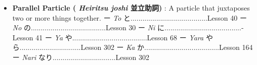 \begin{itemize}
\item \textbf{Parallel Particle ( \emph{Heiritsu joshi }並立助詞) }: A particle that juxtaposes two or more things together. \hfill\break
\hfill\break
ー \emph{To }と\dothyp{}\dothyp{}\dothyp{}\dothyp{}\dothyp{}\dothyp{}\dothyp{}\dothyp{}\dothyp{}\dothyp{}\dothyp{}\dothyp{}\dothyp{}\dothyp{}\dothyp{}\dothyp{}\dothyp{}\dothyp{}\dothyp{}\dothyp{}\dothyp{}\dothyp{}\dothyp{}\dothyp{}\dothyp{}\dothyp{}\dothyp{}\dothyp{}\dothyp{}\dothyp{}\dothyp{}\dothyp{}\dothyp{}\dothyp{}\dothyp{}\dothyp{}\dothyp{}\dothyp{}\dothyp{}Lesson 40 \hfill\break
ー \emph{No }の\dothyp{}\dothyp{}\dothyp{}\dothyp{}\dothyp{}\dothyp{}\dothyp{}\dothyp{}\dothyp{}\dothyp{}\dothyp{}\dothyp{}\dothyp{}\dothyp{}\dothyp{}\dothyp{}\dothyp{}\dothyp{}\dothyp{}\dothyp{}\dothyp{}\dothyp{}\dothyp{}\dothyp{}\dothyp{}\dothyp{}\dothyp{}\dothyp{}\dothyp{}\dothyp{}\dothyp{}\dothyp{}\dothyp{}\dothyp{}\dothyp{}\dothyp{}..Lesson 30 \hfill\break
ー \emph{Ni }に\dothyp{}\dothyp{}\dothyp{}\dothyp{}\dothyp{}\dothyp{}\dothyp{}\dothyp{}\dothyp{}\dothyp{}\dothyp{}\dothyp{}\dothyp{}\dothyp{}\dothyp{}\dothyp{}\dothyp{}\dothyp{}\dothyp{}\dothyp{}\dothyp{}\dothyp{}\dothyp{}\dothyp{}\dothyp{}\dothyp{}\dothyp{}\dothyp{}\dothyp{}\dothyp{}\dothyp{}\dothyp{}\dothyp{}\dothyp{}\dothyp{}\dothyp{}\dothyp{}\dothyp{}\dothyp{}Lesson 41 \hfill\break
ー \emph{Ya }や\dothyp{}\dothyp{}\dothyp{}\dothyp{}\dothyp{}\dothyp{}\dothyp{}\dothyp{}\dothyp{}\dothyp{}\dothyp{}\dothyp{}\dothyp{}\dothyp{}\dothyp{}\dothyp{}\dothyp{}\dothyp{}\dothyp{}\dothyp{}\dothyp{}\dothyp{}\dothyp{}\dothyp{}\dothyp{}\dothyp{}\dothyp{}\dothyp{}\dothyp{}\dothyp{}\dothyp{}\dothyp{}\dothyp{}\dothyp{}\dothyp{}\dothyp{}..Lesson 68 \hfill\break
ー \emph{Yara }やら\dothyp{}\dothyp{}\dothyp{}\dothyp{}\dothyp{}\dothyp{}\dothyp{}\dothyp{}\dothyp{}\dothyp{}\dothyp{}\dothyp{}\dothyp{}\dothyp{}\dothyp{}\dothyp{}\dothyp{}\dothyp{}\dothyp{}\dothyp{}\dothyp{}\dothyp{}\dothyp{}\dothyp{}\dothyp{}\dothyp{}\dothyp{}\dothyp{}\dothyp{}\dothyp{}.Lesson 302 \hfill\break
ー \emph{Ka }か\dothyp{}\dothyp{}\dothyp{}\dothyp{}\dothyp{}\dothyp{}\dothyp{}\dothyp{}\dothyp{}\dothyp{}\dothyp{}\dothyp{}\dothyp{}\dothyp{}\dothyp{}\dothyp{}\dothyp{}\dothyp{}\dothyp{}\dothyp{}\dothyp{}\dothyp{}\dothyp{}\dothyp{}\dothyp{}\dothyp{}\dothyp{}\dothyp{}\dothyp{}\dothyp{}\dothyp{}\dothyp{}\dothyp{}\dothyp{}\dothyp{}\dothyp{}..Lesson 164 \hfill\break
ー \emph{Nari }なり\dothyp{}\dothyp{}\dothyp{}\dothyp{}\dothyp{}\dothyp{}\dothyp{}\dothyp{}\dothyp{}\dothyp{}\dothyp{}\dothyp{}\dothyp{}\dothyp{}\dothyp{}\dothyp{}\dothyp{}\dothyp{}\dothyp{}\dothyp{}\dothyp{}\dothyp{}\dothyp{}\dothyp{}\dothyp{}\dothyp{}\dothyp{}\dothyp{}\dothyp{}\dothyp{}..Lesson 302 \hfill\break

\end{itemize}
